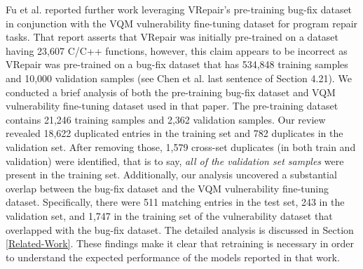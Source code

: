 Fu et al. reported further work leveraging VRepair's pre-training bug-fix dataset in conjunction with the VQM vulnerability fine-tuning dataset for program repair tasks.
That report asserts that VRepair\cite{chen2022neural} was initially pre-trained on a dataset having 23,607 C/C++ functions, however, this claim appears to be incorrect as VRepair was pre-trained on a bug-fix dataset that has 534,848 training samples and 10,000 validation samples (see Chen et al.\cite{chen2022neural} last sentence of Section 4.21).
We conducted a brief analysis of both the pre-training bug-fix dataset and VQM vulnerability fine-tuning dataset\cite{vqm2024} used in that paper. The pre-training dataset contains 21,246 training samples and 2,362 validation samples.
Our review revealed 18,622 duplicated entries in the training set and 782 duplicates in the validation set.
After removing those, 1,579 cross-set duplicates (in both train and validation) were identified, that is to say, \textit{all of the validation set samples} were present in the training set. 
Additionally, our analysis uncovered a substantial overlap between the bug-fix dataset and the VQM vulnerability fine-tuning dataset. Specifically, there were 511 matching entries in the test set, 243 in the validation set, and 1,747 in the training set of the vulnerability dataset that overlapped with the bug-fix dataset. 
The detailed analysis is discussed in Section \ref{Related-Work}.
These findings make it clear that retraining is necessary in order to understand the expected performance of the models reported in that work.




